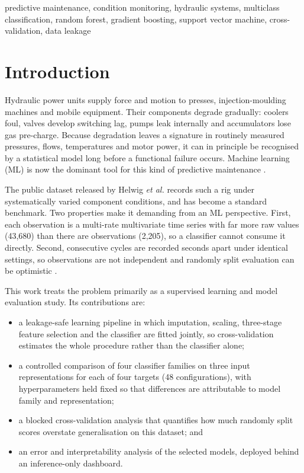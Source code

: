 \documentclass[conference]{IEEEtran}
\begin{document}
\begin{IEEEkeywords}
predictive maintenance, condition monitoring, hydraulic systems, multiclass
classification, random forest, gradient boosting, support vector machine,
cross-validation, data leakage
\end{IEEEkeywords}

\section{Introduction}
Hydraulic power units supply force and motion to presses, injection-moulding
machines and mobile equipment. Their components degrade gradually: coolers
foul, valves develop switching lag, pumps leak internally and accumulators
lose gas pre-charge. Because degradation leaves a signature in routinely
measured pressures, flows, temperatures and motor power, it can in principle be
recognised by a statistical model long before a functional failure occurs.
Machine learning (ML) is now the dominant tool for this kind of predictive
maintenance \cite{carvalho2019}.

The public dataset released by Helwig \textit{et al.}
\cite{helwig2015,uci_hydraulic} records such a rig under systematically varied
component conditions, and has become a standard benchmark. Two properties make
it demanding from an ML perspective. First, each observation is a multi-rate
multivariate time series with far more raw values (43{,}680) than there are
observations (2{,}205), so a classifier cannot consume it directly. Second,
consecutive cycles are recorded seconds apart under identical settings, so
observations are not independent and randomly split evaluation can be
optimistic \cite{kaufman2012,roberts2017}.

This work treats the problem primarily as a supervised learning and model
evaluation study. Its contributions are:
\begin{itemize}
\item a leakage-safe learning pipeline in which imputation, scaling,
three-stage feature selection and the classifier are fitted jointly, so
cross-validation estimates the whole procedure rather than the classifier
alone;
\item a controlled comparison of four classifier families on three input
representations for each of four targets (48 configurations), with
hyperparameters held fixed so that differences are attributable to model
family and representation;
\item a blocked cross-validation analysis that quantifies how much randomly
split scores overstate generalisation on this dataset; and
\item an error and interpretability analysis of the selected models, deployed
behind an inference-only dashboard.
\end{itemize}
\end{document}
